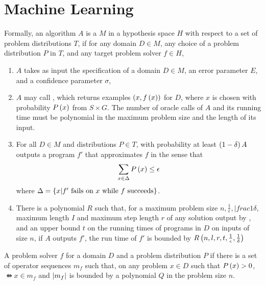 \chapter{Machine Learning}

\begin{defi}%
Formally, an algorithm $A$ is a  $M$ in a hypothesis space $H$ with respect to a set of problem distributions $T$, if for any domain $D\in M$, any choice of a problem distribution $P$ in $T$, and any target problem solver $f\in H$,
\begin{enumerate}
\item $A$ takes as input the specification of a domain $D\in M$, an error parameter $E$, and a confidence parameter $\sigma$,
\item $A$ may call , which returns examples $\left( x,f\left(x\right)\right)$ for $D$, where $x$ is chosen with probability $P\left(x\right)$ from $S\times G$. The number of oracle calls of $A$ and its running time must be polynomial in the maximum problem size and the length of its input.
\item For all $D\in M$ and distributions $P\in T$, with probability at least $\left( 1-\delta\right)A$ outputs a program $f'$ that approximates $f$ in the sense that
\begin{equation}
\displaystyle\sum_{x\in\Delta}{P\left(x\right)}\leq\epsilon
\end{equation}
where $\Delta=\left\{ x | f'\mbox{ fails on }x\mbox{ while }f\mbox{ succeeds}\right\}$.
\item There is a polynomial $R$ such that, for a maximum problem size $n,\frac{1}{\epsilon},|frac{1}{\delta}$, maximum length $I$ and maximum step length $r$ of any solution output by , and an upper bound $t$ on the running times of programs in $D$ on inputs of size $n$, if $A$ outputs $f'$, the run time of $f'$ is bounded by $R\left(n,l,r,t,\frac{1}{\epsilon},\frac{1}{\delta}\right)$
\end{enumerate}
\cite{conf/ijcai/Tadepalli91}
\end{defi}

\begin{defi}
A problem solver $f$ for a domain $D$ and a problem distribution $P$  if there is a set of operator sequences $m_f$ such that, on any problem $x\in D$ such that $P\left(x\right)>0$, $\ffun{x}\in m_f$ and $\left|m_f\right|$ is bounded by a polynomial $Q$ in the problem size $n$.
\cite{conf/ijcai/Tadepalli91}
\end{defi}


